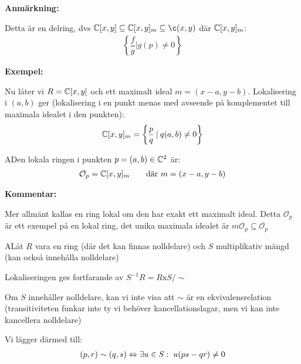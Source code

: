 \par\bigskip
\noindent\textbf{Anmärkning:}\par
\noindent Detta är en delring, dvs $\C[x,y]\subseteq\C[x,y]_m\subseteq\c(x,y)$ där $\mathbb{C}[x,y]_m$:
\begin{equation*}
  \begin{gathered}
    \left\{\dfrac{f}{g}|g(p)\neq0\right\}
  \end{gathered}
\end{equation*}
\par\bigskip
\noindent\textbf{Exempel:}\par
\noindent Nu låter vi $R = \mathbb{C}[x,y]$ och ett maximalt ideal $m = (x-a,y-b)$. Lokalisering i $(a,b)$ ger (lokalisering i en punkt menas med avseende på komplementet till maximala idealet i den punkten):
\begin{equation*}
  \begin{gathered}
    \mathbb{C}[x,y]_m = \left\{\dfrac{p}{q}\:|\: q(a,b)\neq0\right\}
  \end{gathered}
\end{equation*}
\par\bigskip
\begin{theo}
  ADen lokala ringen i punkten $p=(a,b)\in\mathbb{C}^2$ är:
  \begin{equation*}
    \begin{gathered}
      \mathcal{O}_p =\mathbb{C}[x,y]_m\qquad \text{där }m=(x-a,y-b)
    \end{gathered}
  \end{equation*}
\end{theo}
\par\bigskip
\noindent\textbf{Kommentar:}\par
\noindent Mer allmänt kallas en ring lokal om den har exakt ett maximalt ideal. Detta $\mathcal{O}_p$ är ett exempel på en lokal ring, det unika maximala idealet är $m\mathcal{O}_p\subseteq\mathcal{O}_p$
\par\bigskip
\begin{theo}
  ALåt $R$ vara en ring (där det kan finnas nolldelare) och $S$ multiplikativ mängd (kan också innehålla nolldelare)
  \par\bigskip
  \noindent Lokaliseringen ges fortfarande av $S^{-1}R = R\text{x}S/\sim$
  \par\bigskip
  \noindent Om $S$ innehåller nolldelare, kan vi inte visa att $\sim$ är en ekvivalensrelation (transitiviteten funkar inte ty vi behöver kancellationslagar, men vi kan inte kancellera nolldelare)
  \par\bigskip
  \noindent Vi lägger därmed till:
  \begin{equation*}
    \begin{gathered}
      (p,r)\sim(q,s)\Leftrightarrow\exists u\in S:\; u(ps-qr)\neq0
    \end{gathered}
  \end{equation*}
\end{theo}

